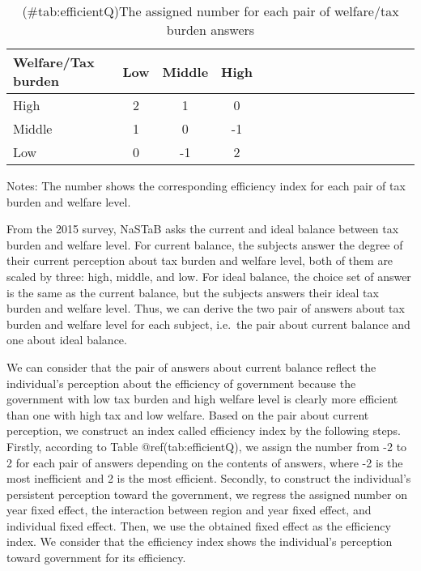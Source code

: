 \documentclass[
]{article}
\begin{document}
\begin{table}

\caption{(\#tab:efficientQ)The assigned number for each pair of welfare/tax burden answers}
\centering
\fontsize{8}{10}\selectfont
\begin{threeparttable}
\begin{tabular}[t]{l|cccl|cccl|cccl|ccc}
\toprule
Welfare/Tax burden & Low & Middle & High\\
\midrule
High & 2 & 1 & 0\\
Middle & 1 & 0 & -1\\
Low & 0 & -1 & 2\\
\bottomrule
\end{tabular}
\begin{tablenotes}
\item Notes: The number shows the corresponding efficiency index for each pair of tax burden and welfare level.
\end{tablenotes}
\end{threeparttable}
\end{table}

From the 2015 survey, NaSTaB asks the current and ideal balance between tax burden and welfare level.
For current balance, the subjects answer the degree of their current perception about tax burden and welfare level,
both of them are scaled by three: high, middle, and low.
For ideal balance, the choice set of answer is the same as the current balance, but the subjects answers their ideal tax burden and welfare level.
Thus, we can derive the two pair of answers about tax burden and welfare level for each subject, i.e.~the pair about current balance and one about ideal balance.

We can consider that the pair of answers about current balance reflect the individual's perception about the efficiency of government
because the government with low tax burden and high welfare level is clearly more efficient than one with high tax and low welfare.
Based on the pair about current perception, we construct an index called efficiency index by the following steps.
Firstly, according to Table @ref(tab:efficientQ),
we assign the number from -2 to 2 for each pair of answers depending on the contents of answers,
where -2 is the most inefficient and 2 is the most efficient.
Secondly, to construct the individual's persistent perception toward the government,
we regress the assigned number on year fixed effect, the interaction between region and year fixed effect, and individual fixed effect.
Then, we use the obtained fixed effect as the efficiency index.
We consider that the efficiency index shows the individual's perception toward government for its efficiency.
\end{document}
